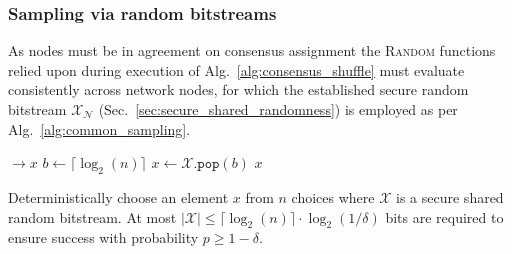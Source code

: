 %
%

\subsubsection{Sampling via random bitstreams} \label{sec:random_bitstreams}

As nodes must be in agreement on consensus assignment the \textsc{Random} functions relied upon during execution of Alg.~\ref{alg:consensus_shuffle} must evaluate consistently across network nodes, for which the established secure random bitstream $\mathcal{X}_\mathcal{N}$ (Sec.~\ref{sec:secure_shared_randomness}) is employed as per Alg.~\ref{alg:common_sampling}.

\begin{algorithm}[H]
	\begin{algorithmic}
		 $\to x$
		\Repeat
		\State $b \gets \lceil \log_2(n) \rceil$ 
		\State $x \gets \mathcal{X}.\mathtt{pop}(b)$ 
		 
		\State \Return $x$
		\EndFunction
	\end{algorithmic}
	\caption{Deterministically choose an element $x$ from $n$ choices where $\mathcal{X}$ is a secure shared random bitstream. At most \mbox{$|\mathcal{X}| \leq \lceil \log_2(n) \rceil \cdot \log_2(1/\delta)$} bits are required to ensure success with probability \mbox{$p\geq 1-\delta$}.} \label{alg:common_sampling}
\end{algorithm}

